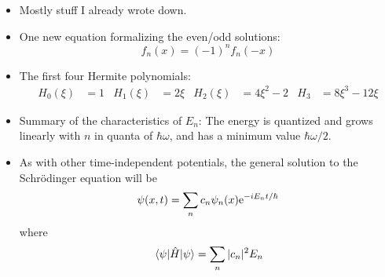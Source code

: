 \documentclass[../notes.tex]{subfiles}
\begin{document}
\begin{itemize}
\begin{itemize}
        \item Mostly stuff I already wrote down.
        \item One new equation formalizing the even/odd solutions:
        \begin{equation*}
            f_n(x) = (-1)^nf_n(-x)
        \end{equation*}
        \item The first four Hermite polynomials:
        \begin{align*}
            H_0(\xi) &= 1&
            H_1(\xi) &= 2\xi&
            H_2(\xi) &= 4\xi^2-2&
            H_3 &= 8\xi^3-12\xi
        \end{align*}
        \item Summary of the characteristics of $E_n$: The energy is quantized and grows linearly with $n$ in quanta of $\hbar\omega$, and has a minimum value $\hbar\omega/2$.
        \item As with other time-independent potentials, the general solution to the Schr\"{o}dinger equation will be
        \begin{equation*}
            \psi(x,t) = \sum_nc_n\psi_n(x)\e[-iE_nt/\hbar]
        \end{equation*}
        where
        \begin{equation*}
            \ev{\hat{H}}{\psi} = \sum_n|c_n|^2E_n
        \end{equation*}
    \end{itemize}
\end{itemize}
\end{document}

